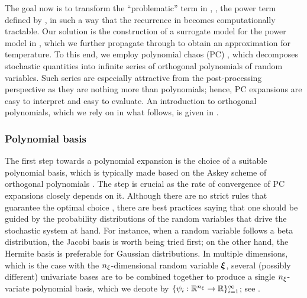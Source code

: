 The goal now is to transform the ``problematic'' term in , \ie, the power term defined by , in such a way that the recurrence in  becomes computationally tractable.
Our solution is the construction of a surrogate model for the power model in , which we further propagate through  to obtain an approximation for temperature.
To this end, we employ polynomial chaos (PC) \cite{xiu2010}, which decomposes stochastic quantities into infinite series of orthogonal polynomials of random variables.
Such series are especially attractive from the post-processing perspective as they are nothing more than polynomials; hence, PC expansions are easy to interpret and easy to evaluate.
An introduction to orthogonal polynomials, which we rely on in what follows, is given in .

\subsubsection{Polynomial basis} 
The first step towards a polynomial expansion is the choice of a suitable polynomial basis, which is typically made based on the Askey scheme of orthogonal polynomials \cite{xiu2010}.
The step is crucial as the rate of convergence of PC expansions closely depends on it.
Although there are no strict rules that guarantee the optimal choice \cite{knio2006}, there are best practices saying that one should be guided by the probability distributions of the random variables that drive the stochastic system at hand.
For instance, when a random variable follows a beta distribution, the Jacobi basis is worth being tried first; on the other hand, the Hermite basis is preferable for Gaussian distributions.
In multiple dimensions, which is the case with the ${n_\xi}$-dimensional random variable $\boldsymbol{\xi}$, several (possibly different) univariate bases are to be combined together to produce a single ${n_\xi}$-variate polynomial basis, which we denote by $\{ \psi_i: \mathbb{R}^{n_\xi} \to \mathbb{R} \}_{i = 1}^\infty$; see \cite{xiu2010}.

